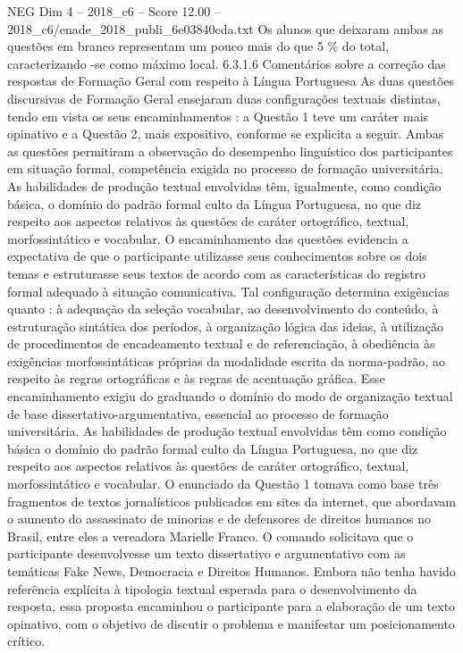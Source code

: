 \begin{textsample}{NEG Dim 4 – 2018\_c6 – Score 12.00 – 2018\_c6/enade\_2018\_publi\_6e03840cda.txt}
Os alunos que deixaram ambas as questões em branco representam um pouco mais do que 5 \% do total, caracterizando -se como máximo local. 6.3.1.6 Comentários sobre a correção das respostas de Formação Geral com respeito à Língua Portuguesa As duas questões discursivas de Formação Geral ensejaram duas configurações textuais distintas, tendo em vista os seus encaminhamentos : a Questão 1 teve um caráter mais opinativo e a Questão 2, mais expositivo, conforme se explicita a seguir.
Ambas as questões permitiram a observação do desempenho linguístico dos participantes em situação formal, competência exigida no processo de formação universitária.
As habilidades de produção textual envolvidas têm, igualmente, como condição básica, o domínio do padrão formal culto da Língua Portuguesa, no que diz respeito aos aspectos relativos às questões de caráter ortográfico, textual, morfossintático e vocabular.
O encaminhamento das questões evidencia a expectativa de que o participante utilizasse seus conhecimentos sobre os dois temas e estruturasse seus textos de acordo com as características do registro formal adequado à situação comunicativa.
Tal configuração determina exigências quanto : à adequação da seleção vocabular, ao desenvolvimento do conteúdo, à estruturação sintática dos períodos, à organização lógica das ideias, à utilização de procedimentos de encadeamento textual e de referenciação, à obediência às exigências morfossintáticas próprias da modalidade escrita da norma-padrão, ao respeito às regras ortográficas e às regras de acentuação gráfica.
Esse encaminhamento exigiu do graduando o domínio do modo de organização textual de base dissertativo-argumentativa, essencial ao processo de formação universitária.
As habilidades de produção textual envolvidas têm como condição básica o domínio do padrão formal culto da Língua Portuguesa, no que diz respeito aos aspectos relativos às questões de caráter ortográfico, textual, morfossintático e vocabular.
O enunciado da Questão 1 tomava como base três fragmentos de textos jornalísticos publicados em sites da internet, que abordavam o aumento do assassinato de minorias e de defensores de direitos humanos no Brasil, entre eles a vereadora Marielle Franco.
O comando solicitava que o participante desenvolvesse um texto dissertativo e argumentativo com as temáticas Fake News, Democracia e Direitos Humanos.
Embora não tenha havido referência explícita à tipologia textual esperada para o desenvolvimento da resposta, essa proposta encaminhou o participante para a elaboração de um texto opinativo, com o objetivo de discutir o problema e manifestar um posicionamento crítico.

\end{textsample}
